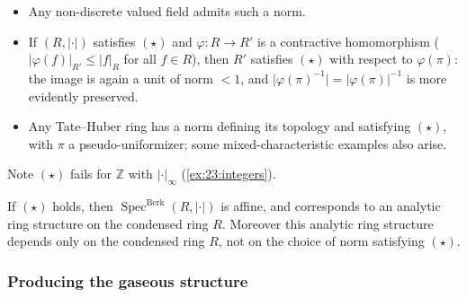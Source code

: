 \begin{example}
\label{ex:23:star-examples}
\leavevmode
\begin{itemize}
\item Any non-discrete valued field admits such a norm.
\item If $(R,\lvert\cdot\rvert)$ satisfies $(\star)$ and $\varphi\colon R\to R'$
is a contractive homomorphism ($\lvert\varphi(f)\rvert_{R'}\le\lvert f\rvert_R$
for all $f\in R$), then $R'$ satisfies $(\star)$ with respect to $\varphi(\pi)$:
the image is again a unit of norm $<1$, and $\lvert\varphi(\pi)^{-1}\rvert
=\lvert\varphi(\pi)\rvert^{-1}$ is more evidently preserved.
\item Any Tate--Huber ring has a norm defining its topology and satisfying
$(\star)$, with $\pi$ a pseudo-uniformizer; some mixed-characteristic examples
also arise.
\end{itemize}
Note $(\star)$ fails for $\mathbb Z$ with $\lvert\cdot\rvert_\infty$
(\cref{ex:23:integers}).
\end{example}

\begin{theorem}
\label{thm:23:affine}
If $(\star)$ holds, then
$\operatorname{Spec}^{\mathrm{Berk}}(R,\lvert\cdot\rvert)$ is affine, and
corresponds to an analytic ring structure on the condensed ring $R$. Moreover
this analytic ring structure depends only on the condensed ring $R$, not on the
choice of norm satisfying $(\star)$.
\end{theorem}

\subsubsection*{Producing the gaseous structure}

